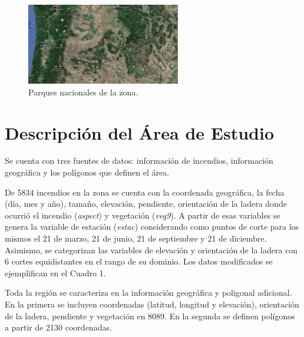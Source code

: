 \documentclass[12,]{article}
\begin{document}
\begin{figure}[H]
\centering
\includegraphics[width=0.6\textwidth]{imagenes/blueM.png}
\caption{Parques nacionales de la zona.}

\end{figure}

\section{Descripción del Área de
Estudio}\label{descripcion-del-area-de-estudio}

Se cuenta con tres fuentes de datos: información de incendios,
información geográfica y los polígonos que definen el área.

De 5834 incendios en la zona se cuenta con la coordenada geográfica, la
fecha (día, mes y año), tamaño, elevación, pendiente, orientación de la
ladera donde ocurrió el incendio (\emph{aspect}) y vegetación
(\emph{veg9}). A partir de esas variables se genera la variable de
estación (\emph{estac}) considerando como puntos de corte para los
mismos el 21 de marzo, 21 de junio, 21 de septiembre y 21 de diciembre.
Asimismo, se categorizan las variables de elevación y orientación de la
ladera con 6 cortes equidistantes en el rango de su dominio. Los datos
modificados se ejemplifican en el Cuadro 1.

Toda la región se caracteriza en la información geográfica y poligonal
adicional. En la primera se incluyen coordenadas (latitud, longitud y
elevación), orientación de la ladera, pendiente y vegetación en 8089. En
la segunda se definen polígonos a partir de 2130 coordenadas.
\end{document}
